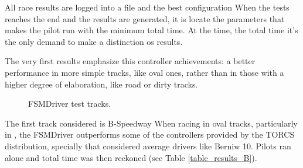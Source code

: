 All race results are logged into a file and the best configuration
When the tests reaches the end and the results are generated, it is locate the 
parameters that makes the pilot run with the minimum total time. At the time, the total time it's the only demand to make a distinction os results.

The very first results emphasize this controller achievements: a better performance in more simple tracks, like oval ones, rather than in those with a higher degree of elaboration, like road or dirty tracks.


\begin{figure}[!t] 
\centering 
{}
\hfill
{}
\caption{FSMDriver test tracks.} 
\label{fig:tracks} 
\end{figure} 

The first track considered is B-Speedway
When racing in oval tracks, particularly in , the FSMDriver outperforms 
some of the controllers provided by the TORCS distribution, specially that considered average drivers like Berniw 10. Pilots ran alone and total time was then reckoned (see Table \ref{table_results_B}).

